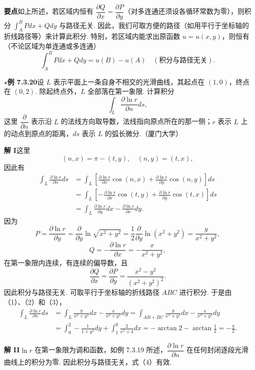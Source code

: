 \documentclass[UTF8, 12pt, fontset=fandol, oneside]{ctexart}
\begin{document}
\noindent\textbf{要点}\quad 如上所述，若区域内恒有 $\dfrac{\partial Q}{\partial x}=\dfrac{\partial P}{\partial y}$（对多连通还须设各循环常数为零），则积分 $\displaystyle\int_A^BPdx+Qdy$ 与路径无关. 因此，我们可取方便的路径（如用平行于坐标轴的折线路径等）来计算此积分. 特别，若区域内能求出原函数 $u=u(x,y)$，则恒有（不论区域为单连通或多连通）
\[
\int_A^BPdx+Qdy=u(B)-u(A)\quad(\text{积分与路径无关}).
\]

\noindent\textbf{$\star$例 7.3.20}\quad 设 $L$ 表示平面上一条自身不相交的光滑曲线，其起点在 $(1,0)$，终点在 $(0,2)$. 除起终点外，$L$ 全部落在第一象限. 计算积分
\[
\int_L\frac{\partial\ln r}{\partial n}ds,
\]
这里 $\dfrac{\partial}{\partial n}$ 表示沿 $L$ 的法线方向取导数，法线指向原点所在的那一侧；$r$ 表示 $L$ 上的动点到原点的距离，$ds$ 表示 $L$ 的弧长微分.（厦门大学）

\noindent\textbf{解 I}\quad 这里
\[
(n,x)=\pi-(t,y),\quad (n,y)=(t,x),
\]
因此有
\begin{equation}
\begin{aligned}
\int_L\frac{\partial\ln r}{\partial n}ds
&=\int_L\left[\frac{\partial\ln r}{\partial x}\cos(n,x)
+\frac{\partial\ln r}{\partial y}\cos(n,y)\right]ds\\
&=\int_L\left[-\frac{\partial\ln r}{\partial x}\cos(t,y)
+\frac{\partial\ln r}{\partial y}\cos(t,x)\right]ds\\
&=\int_L\frac{\partial\ln r}{\partial y}dx
-\frac{\partial\ln r}{\partial x}dy.
\end{aligned}
\tag{1}
\end{equation}
因为
\[
P=\frac{\partial\ln r}{\partial y}
=\frac{\partial}{\partial y}\ln\sqrt{x^2+y^2}
=\frac12\frac{\partial}{\partial y}\ln(x^2+y^2)
=\frac y{x^2+y^2}, \tag{2}
\]
\[
Q=-\frac{\partial\ln r}{\partial x}
=-\frac x{x^2+y^2}, \tag{3}
\]
在第一象限内连续，有连续的偏导数，且
\[
\frac{\partial Q}{\partial x}=\frac{\partial P}{\partial y}
=\frac{x^2-y^2}{(x^2+y^2)^2}.
\]
因此积分与路径无关. 可取平行于坐标轴的折线路径 $ABC$ 进行积分. 于是由（1）、（2）和（3），
\begin{equation}
\begin{aligned}
\int_L\frac{\partial\ln r}{\partial n}ds
&=\int_L\frac y{x^2+y^2}dx-\frac x{x^2+y^2}dy
=\int_{AB+BC}\frac y{x^2+y^2}dx-\frac x{x^2+y^2}dy\\
&=\int_0^2-\frac1{1+y^2}dy+\int_1^0\frac2{x^2+4}dx
=-\arctan2-\arctan\frac12=-\frac\pi2.
\end{aligned}
\tag{4}
\end{equation}

\noindent\textbf{解 II}\quad $\ln r$ 在第一象限为调和函数，如例 7.3.19 所述，$\dfrac{\partial\ln r}{\partial n}$ 在任何封闭逐段光滑曲线上的积分为零. 因此积分与路径无关，式（4）有效.
\end{document}
